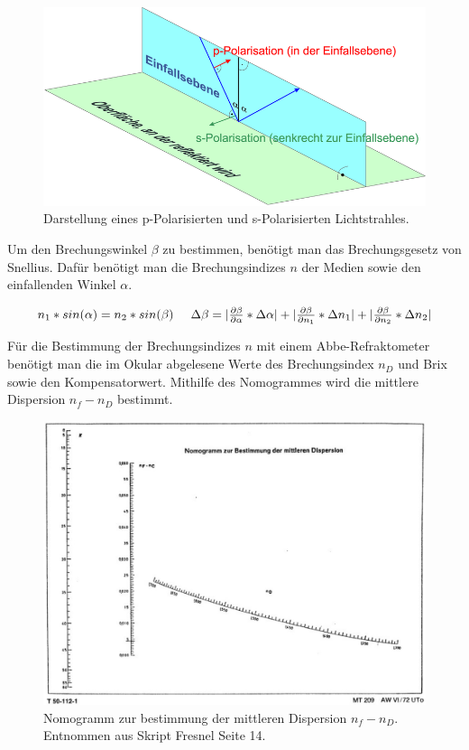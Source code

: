 \documentclass[12pt,a4paper,twoside]{article}
\begin{document}
\begin{figure}[H]
    \centering
    \includegraphics[width=0.6\linewidth]{nudes/sp pol.png}
    \caption{Darstellung eines p-Polarisierten und s-Polarisierten Lichtstrahles. \cite{Polarisation}}
    \label{fig:s-p-Polarisiert}
\end{figure}

\noindent
Um den Brechungswinkel $\beta$ zu bestimmen, benötigt man das Brechungsgesetz von Snellius. Dafür benötigt man die Brechungsindizes $n$ der Medien sowie den einfallenden Winkel $\alpha$. 

\begin{equation}
    \label{eq:Snellius}
    \centerline{$n_1 * sin(\alpha) = n_2 * sin(\beta)$ \\ $\Delta \beta = \vert \frac{\partial \beta}{\partial \alpha} * \Delta \alpha \vert + \vert \frac{\partial \beta}{\partial n_1} * \Delta n_1 \vert + \vert \frac{\partial \beta}{\partial n_2} * \Delta n_2 \vert$}
\end{equation}

\noindent
Für die Bestimmung der Brechungsindizes $n$ mit einem Abbe-Refraktometer benötigt man die im Okular abgelesene Werte des Brechungsindex $n_D$ und Brix sowie den Kompensatorwert. 
Mithilfe des Nomogrammes wird die mittlere Dispersion $n_f-n_D$ bestimmt. 

\begin{figure}[H]
    \centering
    \includegraphics[width=0.6\linewidth]{nudes/nomogramm.jpg}
    \caption{Nomogramm zur bestimmung der mittleren Dispersion $n_f-n_D$. Entnommen aus Skript Fresnel Seite 14. \cite{teachcenter2}}
    \label{fig:nomogramm}
\end{figure}
\end{document}
